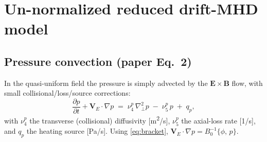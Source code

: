 \documentclass[11pt]{article}
\newcommand{\pb}[2]{\{#1,\,#2\}}
\newcommand{\vE}{\bm{V}_E}
\newcommand{\gradperp}{\nabla_{\!\perp}}
\newcommand{\dd}[2]{\frac{\partial #1}{\partial #2}}
\begin{document}
\section{Un-normalized reduced drift-MHD model}
\label{sec:unnorm}

\subsection{Pressure convection (paper Eq.~2)}
In the quasi-uniform field the pressure is simply advected by the
$\bm{E}\times\bm{B}$ flow, with small collisional/loss/source corrections:
\begin{equation}
  \dd{p}{t} + \vE\cdot\nabla p
    \;=\; \nu_4^{p}\,\gradperp^2 p \;-\; \nu_5^{p}\,p \;+\; q_p,
  \label{eq:pdim}
\end{equation}
with $\nu_4^p$ the transverse (collisional) diffusivity [\si{m^2/s}],
$\nu_5^p$ the axial-loss rate [\si{1/s}], and $q_p$ the heating source
[\si{Pa/s}]. Using \eqref{eq:bracket}, $\vE\cdot\nabla p = B_0^{-1}\pb{\phi}{p}$.
\end{document}
